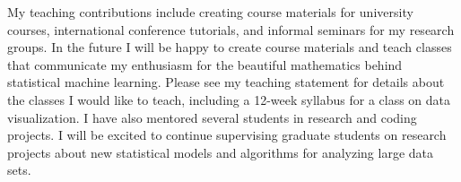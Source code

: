 \documentclass{article}
\begin{document}



My teaching contributions include creating course materials for
university courses, international conference tutorials, and informal
seminars for my research groups. In the future I will be happy to
create course materials and teach classes that communicate my
enthusiasm for the beautiful mathematics behind statistical machine
learning. Please
see my teaching statement for details about the classes I would like
to teach, including a 12-week syllabus for a class on data
visualization. I have also mentored several students in research and
coding projects. I will be excited to continue supervising graduate
students on research projects about new statistical models and
algorithms for analyzing large
data
sets. 
\end{document}
